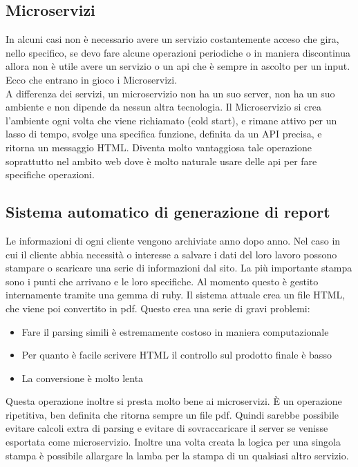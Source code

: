 \documentclass[12pt]{article}
\begin{document}
\subsection{Microservizi}
In alcuni casi non è necessario avere un servizio costantemente acceso che gira,
nello specifico, se devo fare alcune operazioni periodiche o in maniera discontinua
allora non è utile avere un servizio o un api che è sempre in ascolto per un input.
Ecco che entrano in gioco i Microservizi.
\\ A differenza dei servizi, un microservizio non ha un suo server, non ha un suo
ambiente e non dipende da nessun altra tecnologia. Il Microservizio si crea
l'ambiente ogni volta che viene richiamato (cold start), e rimane attivo per un
lasso di tempo, svolge una specifica funzione, definita da un API precisa, e
ritorna un messaggio HTML.
Diventa molto vantaggiosa tale operazione soprattutto nel ambito web dove è molto
naturale usare delle api per fare specifiche operazioni.
\subsection{Sistema automatico di generazione di report}
Le informazioni di ogni cliente vengono archiviate anno dopo anno. Nel caso in cui
il cliente abbia necessità o interesse a salvare i dati del loro lavoro possono
stampare o scaricare una serie di informazioni dal sito. La più importante stampa
sono i punti che arrivano e le loro specifiche. Al momento questo è gestito
internamente tramite una gemma di ruby. Il sistema attuale crea un file HTML,
che viene poi convertito in pdf.
Questo crea una serie di gravi problemi:
\begin{itemize}
  \item Fare il parsing simili è estremamente costoso in maniera computazionale
  \item Per quanto è facile scrivere HTML il controllo sul prodotto finale è basso
  \item La conversione è molto lenta
\end{itemize}
Questa operazione inoltre si presta molto bene ai microservizi. È un operazione
ripetitiva, ben definita che ritorna sempre un file pdf. Quindi sarebbe possibile
evitare calcoli extra di parsing e evitare di sovraccaricare il server se venisse
esportata come microservizio.
Inoltre una volta creata la logica per una singola stampa è possibile allargare
la lamba per la stampa di un qualsiasi altro servizio.
\end{document}
